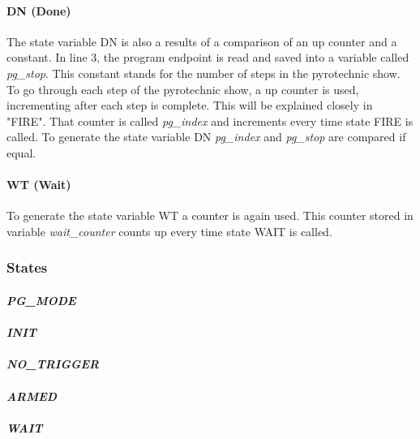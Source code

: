 \paragraph{DN (Done)}
The state variable DN is also a results of a comparison of an up counter and a constant. In   line 3, the program endpoint is read and saved into a variable called \textit{pg\_stop}. This constant stands for the number of steps in the pyrotechnic show. To go through each step of the pyrotechnic show, a up counter is used, incrementing after each step is complete. This will be explained closely in  "FIRE". That counter is called \textit{pg\_index} and increments every time state FIRE is called. To generate the state variable DN  \textit{pg\_index} and \textit{pg\_stop} are compared if equal.

\paragraph{WT (Wait)}

To generate the state variable WT a counter is again used. This counter stored in variable \textit{wait\_counter} counts up every time state WAIT is called. 



\pagebreak

\subsubsection{States}
\label{States}
\paragraph{\textit{PG\_MODE}}
\paragraph{\textit{INIT}}
\paragraph{\textit{NO\_TRIGGER}}
\paragraph{\textit{ARMED}}
\paragraph{\textit{WAIT}}
